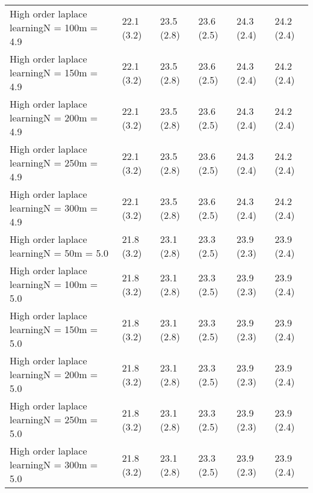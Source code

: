 \documentclass{article}
\begin{document}
\begin{table*}[t!]
\begin{center}
\begin{small}
\begin{sc}
\begin{tabular}{llllll}
High order laplace learningN = 100m = 4.9&22.1 (3.2)      &23.5 (2.8)      &23.6 (2.5)      &24.3 (2.4)      &24.2 (2.4)      \\
High order laplace learningN = 150m = 4.9&22.1 (3.2)      &23.5 (2.8)      &23.6 (2.5)      &24.3 (2.4)      &24.2 (2.4)      \\
High order laplace learningN = 200m = 4.9&22.1 (3.2)      &23.5 (2.8)      &23.6 (2.5)      &24.3 (2.4)      &24.2 (2.4)      \\
High order laplace learningN = 250m = 4.9&22.1 (3.2)      &23.5 (2.8)      &23.6 (2.5)      &24.3 (2.4)      &24.2 (2.4)      \\
High order laplace learningN = 300m = 4.9&22.1 (3.2)      &23.5 (2.8)      &23.6 (2.5)      &24.3 (2.4)      &24.2 (2.4)      \\
High order laplace learningN = 50m = 5.0&21.8 (3.2)      &23.1 (2.8)      &23.3 (2.5)      &23.9 (2.3)      &23.9 (2.4)      \\
High order laplace learningN = 100m = 5.0&21.8 (3.2)      &23.1 (2.8)      &23.3 (2.5)      &23.9 (2.3)      &23.9 (2.4)      \\
High order laplace learningN = 150m = 5.0&21.8 (3.2)      &23.1 (2.8)      &23.3 (2.5)      &23.9 (2.3)      &23.9 (2.4)      \\
High order laplace learningN = 200m = 5.0&21.8 (3.2)      &23.1 (2.8)      &23.3 (2.5)      &23.9 (2.3)      &23.9 (2.4)      \\
High order laplace learningN = 250m = 5.0&21.8 (3.2)      &23.1 (2.8)      &23.3 (2.5)      &23.9 (2.3)      &23.9 (2.4)      \\
High order laplace learningN = 300m = 5.0&21.8 (3.2)      &23.1 (2.8)      &23.3 (2.5)      &23.9 (2.3)      &23.9 (2.4)      \\
\bottomrule
\end{tabular}
\end{sc}
\end{small}
\end{center}
\vskip -0.1in
\end{table*}
\end{document}
